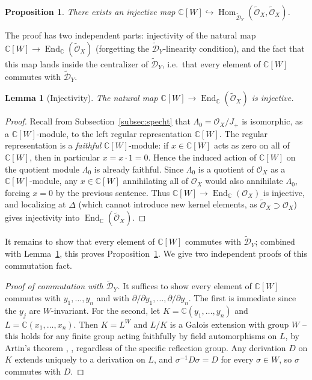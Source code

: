 \documentclass[11pt,a4paper]{article}
\newtheorem{lemma}[theorem]{Lemma}
\newtheorem{proposition}[theorem]{Proposition}
\begin{document}
\begin{proposition}\label{prop:embedding-DY}
There exists an injective map
$\mathbb{C}[W] \hookrightarrow \operatorname{Hom}_{\widetilde{\mathcal{D}}_Y}
(\widetilde{\mathcal{O}}_X, \widetilde{\mathcal{O}}_X)$.
\end{proposition}

The proof has two independent parts: injectivity of the natural map
$\mathbb{C}[W] \to \operatorname{End}_{\mathbb{C}}(\widetilde{\mathcal{O}}_X)$
(forgetting the $\widetilde{\mathcal{D}}_Y$-linearity condition), and
the fact that this map lands inside the centralizer of
$\widetilde{\mathcal{D}}_Y$, i.e.\ that every element of
$\mathbb{C}[W]$ commutes with $\widetilde{\mathcal{D}}_Y$.

\begin{lemma}[Injectivity]\label{lem:CW-injective}
The natural map $\mathbb{C}[W] \to \operatorname{End}_{\mathbb{C}}(\widetilde{\mathcal{O}}_X)$
is injective.
\end{lemma}

\begin{proof}
Recall from Subsection~\ref{subsec:specht} that
$\Lambda_0 = \mathcal{O}_X/J_+$ is isomorphic, as a
$\mathbb{C}[W]$-module, to the left regular representation
$\mathbb{C}[W]$. The regular representation is a \emph{faithful}
$\mathbb{C}[W]$-module: if $x \in \mathbb{C}[W]$ acts as zero on all of
$\mathbb{C}[W]$, then in particular $x = x \cdot 1 = 0$. Hence the
induced action of $\mathbb{C}[W]$ on the quotient module $\Lambda_0$
is already faithful. Since $\Lambda_0$ is a quotient of
$\mathcal{O}_X$ as a $\mathbb{C}[W]$-module, any
$x \in \mathbb{C}[W]$ annihilating all of $\mathcal{O}_X$ would also
annihilate $\Lambda_0$, forcing $x = 0$ by the previous sentence.
Thus $\mathbb{C}[W] \to \operatorname{End}_{\mathbb{C}}(\mathcal{O}_X)$
is injective, and localizing at $\Delta$ (which cannot introduce new
kernel elements, as $\widetilde{\mathcal{O}}_X \supset \mathcal{O}_X$)
gives injectivity into
$\operatorname{End}_{\mathbb{C}}(\widetilde{\mathcal{O}}_X)$.
\end{proof}

It remains to show that every element of $\mathbb{C}[W]$ commutes
with $\widetilde{\mathcal{D}}_Y$; combined with
Lemma~\ref{lem:CW-injective}, this proves
Proposition~\ref{prop:embedding-DY}. We give two independent proofs of
this commutation fact.

\begin{proof}[Proof of commutation with $\widetilde{\mathcal{D}}_Y$]
It suffices to show every element of $\mathbb{C}[W]$ commutes with
$y_1,\dots,y_n$ and with $\partial/\partial y_1, \dots, \partial/\partial
y_n$. The first is immediate since the $y_j$ are $W$-invariant. For
the second, let $K = \mathbb{C}(y_1,\dots,y_n)$ and
$L = \mathbb{C}(x_1,\dots,x_n)$. Then $K = L^{W}$ and $L/K$ is a
Galois extension with group $W$ -- this holds for any finite group
acting faithfully by field automorphisms on $L$, by Artin's theorem
\cite{Artin1942}, \cite[Chap.\ VI]{Lang2002},
regardless of the specific reflection group. Any derivation $D$ on $K$
extends uniquely to a derivation on $L$, and
$\sigma^{-1} D \sigma = D$ for every $\sigma \in W$, so $\sigma$
commutes with $D$.
\end{proof}
\end{document}
